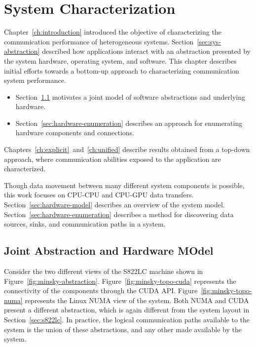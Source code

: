 \chapter{System Characterization}
\label{ch:sys-char}

Chapter~\ref{ch:introduction} introduced the objective of characterizing the communication performance of heterogeneous systems.
Section~\ref{sec:sys-abstraction} described how applications interact with an abstraction presented by the system hardware, operating system, and software.
This chapter describes initial efforts towards a bottom-up approach to characterizing communication system performance.

\begin{itemize}
    \item Section~\ref{sec:abstraction-hardware} motivates a joint model of software abstractions and underlying hardware.
    \item Section~\ref{sec:hardware-enumeration} describes an approach for enumerating hardware components and connections.
\end{itemize}

Chapters~\ref{ch:explicit}~and~\ref{ch:unified} describe results obtained from a top-down approach, where communication abilities exposed to the application are characterized.


Though data movement between many different system components is possible, this work focuses on CPU-CPU and CPU-GPU data transfers.
Section~\ref{sec:hardware-model} describes an overview of the system model.
Section~\ref{sec:hardware-enumeration} describes a method for discovering data sources, sinks, and communication paths in a system.


\section{Joint Abstraction and Hardware MOdel}
\label{sec:abstraction-hardware}

Consider the two different views of the S822LC machine shown in Figure~\ref{fig:minsky-abstraction}.
Figure~\ref{fig:minsky-topo-cuda} represents the connectivity of the components through the CUDA API.
Figure~\ref{fig:minsky-topo-numa} represents the Linux NUMA view of the system.
Both NUMA and CUDA present a different abstraction, which is again different from the system layout in Section~\ref{sec:s822lc}.
In practice, the logical communication paths available to the system is the union of these abstractions, and any other made available by the system.

